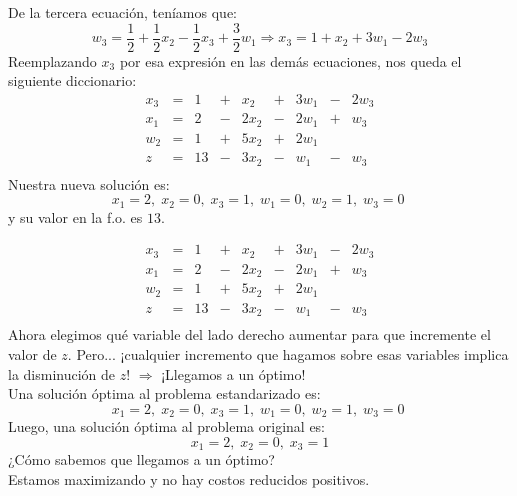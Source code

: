 \documentclass[10pt, aspectratio=169]{beamer}
\begin{document}
    \begin{frame}{}
        \small
        De la tercera ecuación, teníamos que:
        \[w_3 = \frac{1}{2}+\frac{1}{2}x_2-\frac{1}{2}x_3+\frac{3}{2}w_1 \Rightarrow x_3=1+x_2+3w_1-2w_3\]
        Reemplazando $x_3$ por esa expresión en las demás ecuaciones, nos queda el siguiente diccionario:
        \[
            \begin{array}{rrrrrrrrr}
                x_3 & = & 1  & + & x_2  & + & 3w_1 & - & 2w_3 \\
                x_1 & = & 2  & - & 2x_2 & - & 2w_1 & + & w_3  \\
                w_2 & = & 1  & + & 5x_2 & + & 2w_1 &   &      \\\hline
                z   & = & 13 & - & 3x_2 & - & w_1  & - & w_3  \\
            \end{array}
        \]
        Nuestra nueva solución es:
        \[x_1=2,\; x_2=0,\; x_3=1,\; w_1=0,\; w_2=1,\; w_3=0\;\]
        y su valor en la f.o. es $13$.\\
    \end{frame}

    \begin{frame}{}
        \small
        \[\begin{array}{rrrrrrrrr}
              x_3 & = & 1  & + & x_2  & + & 3w_1 & - & 2w_3 \\
              x_1 & = & 2  & - & 2x_2 & - & 2w_1 & + & w_3  \\
              w_2 & = & 1  & + & 5x_2 & + & 2w_1 &   &      \\\hline
              z   & = & 13 & - & 3x_2 & - & w_1  & - & w_3  \\
        \end{array}
        \]
        Ahora elegimos qué variable del lado derecho aumentar para que incremente el valor de $z$. \pause
        Pero... ¡cualquier incremento que hagamos sobre esas variables implica la disminución de $z$! $\Rightarrow$
        ¡Llegamos a un óptimo! \\
        Una solución óptima al problema estandarizado es:
        \[x_1=2,\; x_2=0,\; x_3=1,\; w_1=0,\; w_2=1,\; w_3=0\;\]
        Luego, una solución óptima al problema original es:
        \[x_1=2,\; x_2=0,\; x_3=1\]
        ¿Cómo sabemos que llegamos a un óptimo?\\
        Estamos maximizando y no hay costos reducidos positivos.
    \end{frame}
\end{document}
